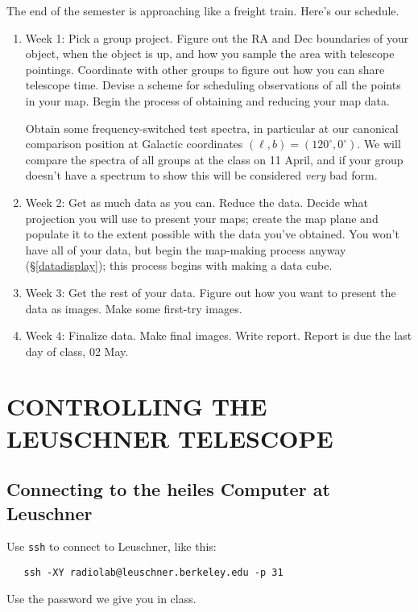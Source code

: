 \documentclass[psfig,preprint]{aastex}
\begin{document}
The end of the semester is approaching like a freight train. Here's our
schedule.  \begin{enumerate}

\item Week 1: Pick a group project. Figure out the RA and
  Dec boundaries of your object, when the object is up, and how you
  sample the area with telescope pointings. Coordinate with other groups
  to figure out how you can share telescope time.
Devise a scheme for scheduling observations of all the points in your
map.  Begin the process of obtaining and reducing your map data. 

Obtain some frequency-switched test spectra, in
particular at our canonical comparison position at Galactic coordinates
$(\ell, b) = (120^\circ, 0^\circ)$.  We will compare the spectra of all
groups at the class on 11 April, and if your group doesn't have a
spectrum to show this will be considered {\it very} bad form.

\item Week 2: Get as much data as you can. Reduce the data.  Decide what
  projection you will use to present your maps; create the map plane and
  populate it to the extent possible with the data you've obtained.  You
  won't have all of your data, but begin the map-making process anyway
  (\S \ref{datadisplay}); this process begins with making a data cube.

\item Week 3: Get the rest of your data. Figure out
  how you want to present the data as images. Make some first-try
  images. 

\item Week 4: Finalize data. Make final images. Write
report. Report is due the last day of class, 02 May.
\end{enumerate}

\section {CONTROLLING THE LEUSCHNER TELESCOPE}

\subsection {Connecting to the heiles Computer at Leuschner}
Use {\tt ssh} to connect to Leuschner, like this:
\begin{verbatim}
   ssh -XY radiolab@leuschner.berkeley.edu -p 31
\end{verbatim}
\noindent Use the password we give you in class.
\end{document}

